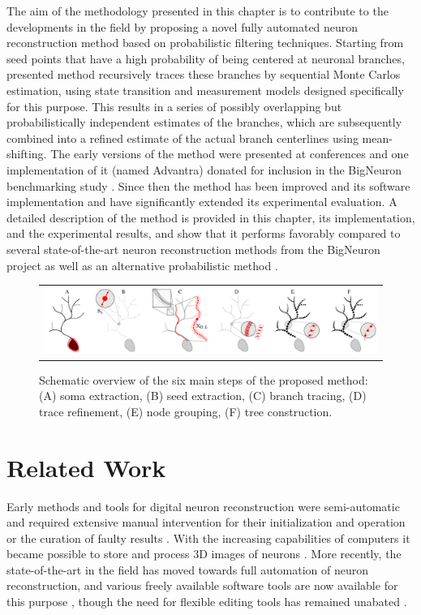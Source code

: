 The aim of the methodology presented in this chapter is to contribute to the developments in the field by proposing a novel fully automated neuron reconstruction method based on probabilistic filtering techniques. Starting from seed points that have a high probability of being centered at neuronal branches, presented method recursively traces these branches by sequential Monte Carlos estimation, using state transition and measurement models designed specifically for this purpose. This results in a series of possibly overlapping but probabilistically independent estimates of the branches, which are subsequently combined into a refined estimate of the actual branch centerlines using mean-shifting. The early versions of the method were presented at conferences \cite{radojevic2015automated, radojevic2017neuron} and one implementation of it (named Advantra) donated for inclusion in the BigNeuron benchmarking study \cite{peng2015bigneuron, peng2015diadem}. Since then the method has been improved and its software implementation and have significantly extended its experimental evaluation. A detailed description of the method is provided in this chapter, its implementation, and the experimental results, and show that it performs favorably compared to several state-of-the-art neuron reconstruction methods from the BigNeuron project as well as an alternative probabilistic method \cite{radojevic2017automated}.
\begin{figure}
	\begin{tabular}{c}
		\includegraphics[width=\textwidth]{fig1}
	\end{tabular}
	\caption{Schematic overview of the six main steps of the proposed method: (A) soma extraction, (B) seed extraction, (C) branch tracing, (D) trace refinement, (E) node grouping, (F) tree construction.}
	\label{ch4_fig1}
\end{figure}
\section{Related Work}
\label{sec:related-work}
Early methods and tools for digital neuron reconstruction were semi-automatic and required extensive manual intervention for their initialization and operation or the curation of faulty results \cite{glaser1965semi, capowski1981accurate, glaser1990neuron, masseroli1993quantitative}. With the increasing capabilities of computers it became possible to store and process 3D images of neurons \cite{cohen1994automated, belichenko1995confocal}. More recently, the state-of-the-art in the field has moved towards full automation of neuron reconstruction, and various freely available software tools are now available for this purpose \cite{peng2010v3d, longair2011simple, peng2014extensible, peng2014virtual}, though the need for flexible editing tools has remained unabated \cite{luisi2011farsight, dercksen2014filament}.


